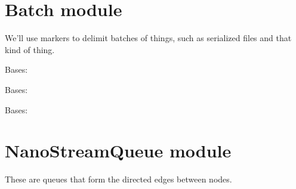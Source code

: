 \documentclass[letterpaper,10pt,english]{sphinxmanual}
\begin{document}
\label{\detokenize{api:module-nanostream.message.batch}}

\section{Batch module}
\label{\detokenize{api:batch-module}}
We’ll use markers to delimit batches of things, such as serialized
files and that kind of thing.

\begin{fulllineitems}
\label{\detokenize{api:nanostream.message.batch.BatchEnd}}
Bases: 

\end{fulllineitems}


\begin{fulllineitems}
\label{\detokenize{api:nanostream.message.batch.BatchStart}}
Bases: 

\end{fulllineitems}

\label{\detokenize{api:module-nanostream.message.canary}}

\begin{fulllineitems}
\label{\detokenize{api:nanostream.message.canary.Canary}}
Bases: 

\end{fulllineitems}

\label{\detokenize{api:module-nanostream.node_queue.queue}}

\section{NanoStreamQueue module}
\label{\detokenize{api:nanostreamqueue-module}}
These are queues that form the directed edges between nodes.
\end{document}
